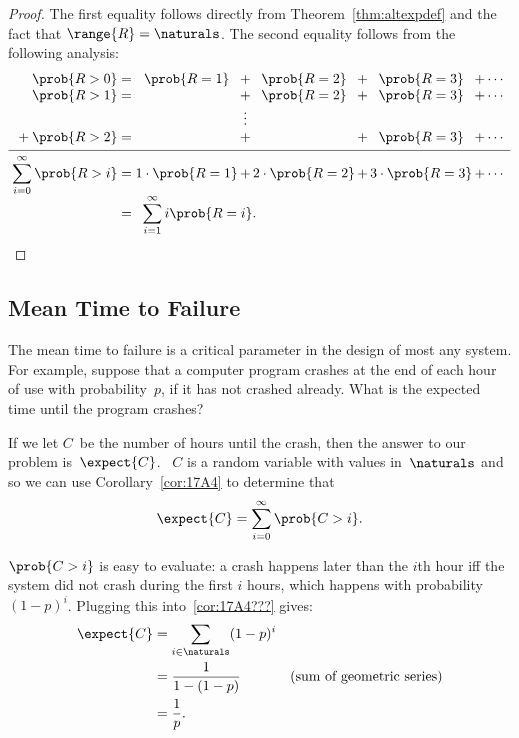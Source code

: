 \begin{proof}
The first equality follows directly from Theorem~\ref{thm:altexpdef}
and the fact that $\range{R} = \naturals$.  The second equality
follows from the following analysis:
\begin{equation*}
\begin{array}{c@{}r@{\;}c@{\;}c@{\,}c@{\,}c@{\,}c@{\,}c@{\,}c@{\,}c}
      & \prob{R > 0} &=&
            \prob{R = 1} &+& \prob{R = 2} &+& \prob{R = 3} &+& \cdots\\
      & \prob{R > 1} &=&
                         &+& \prob{R = 2} &+& \prob{R = 3} &+& \cdots\\
      & &&&\vdots \\
{}+{} & \prob{R > 2} &=&
                         &+&              &+& \prob{R = 3} &+&
            \cdots\\[\jot]
\hline\noalign{\vskip\jot}
      & \llap{$\displaystyle\sum_{i = 0}^\infty \prob{R > i}$} &=&
            1 \cdot \prob{R = 1} &+& 2 \cdot \prob{R = 2}
                &+& 3 \cdot \prob{R = 3} &+& \cdots\\[\jot]
      & &=& \multicolumn{7}{l}{\displaystyle\sum_{i = 1}^\infty i \prob{R = i}.}
\qedhere
\end{array}
\end{equation*}
\end{proof}

\subsection{Mean Time to Failure}\label{mean_time_to_failure_subsec}

The mean time to failure is a critical parameter in the design of most
any system.  For example, suppose that a computer program crashes at
the end of each hour of use with probability~$p$, if it has not
crashed already.  What is the expected time until the program crashes?

If we let $C$~be the number of hours until the crash, then the answer
to our problem is~$\expect{C}$.  \ $C$ is a random variable with values
in~$\naturals$ and so we can use Corollary~\ref{cor:17A4} to determine
that
\begin{equation}\label{eqn:17:16.7}
    \expect{C} = \sum_{i = 0}^\infty \prob{C > i}.
\end{equation}

$\prob{C > i}$ is easy to evaluate: a crash happens later than the
$i$th hour iff the system did not crash during the first $i$ hours,
which happens with probability $(1-p)^i$.  Plugging this
into~\ref{cor:17A4???} gives:
%
\begin{align}
\expect{C} & = \sum_{i \in \naturals} (1-p)^i \notag\\
       & = \frac{1}{1 - (1-p)} & \text{(sum of geometric series)}\notag\\
       & = \frac{1}{p}. \label{eqn:17T10}
\end{align}

